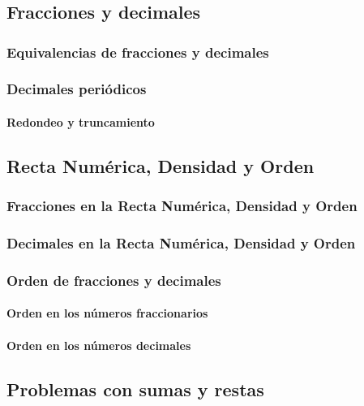 \documentclass[11pt]{book}
\begin{document}
\pagestyle{empty}

\restoregeometry
{}
\tableofcontents
\chapter{}
\pagestyle{fancy}
\section{Fracciones y decimales}
\subsection{Equivalencias de fracciones y decimales}
\subsection{Decimales peri\'odicos}
\subsubsection{Redondeo y truncamiento}

\newpage
\section{Recta Num\'erica, Densidad y Orden}
\subsection{Fracciones en la Recta Num\'erica, Densidad y Orden}
\subsection{Decimales en la Recta Num\'erica, Densidad y Orden}
\subsection{Orden de fracciones y decimales}
\subsubsection{Orden en los n\'umeros fraccionarios}
\subsubsection{Orden en los n\'umeros decimales}

\newpage
\section{Problemas con sumas y restas}
\end{document}
